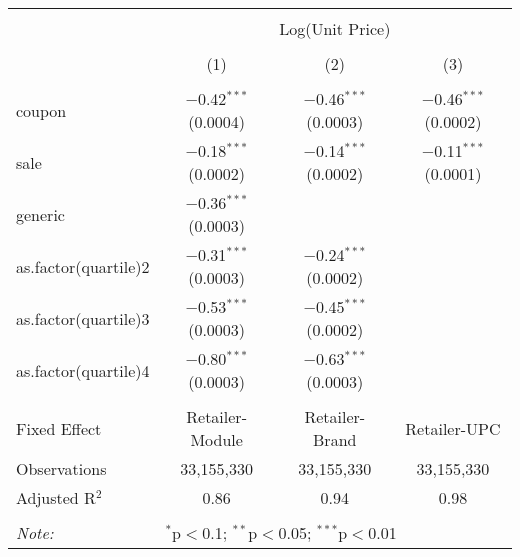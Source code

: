 
\begin{table}[!htbp] \centering 
  \caption{} 
  \label{tab:overallSavings} 
\begin{tabular}{@{\extracolsep{5pt}}lccc} 
\\[-1.8ex]\hline 
\hline \\[-1.8ex] 
 & \multicolumn{3}{c}{Log(Unit Price)} \\ 
\\[-1.8ex] & (1) & (2) & (3)\\ 
\hline \\[-1.8ex] 
 coupon & $-$0.42$^{***}$ (0.0004) & $-$0.46$^{***}$ (0.0003) & $-$0.46$^{***}$ (0.0002) \\ 
  sale & $-$0.18$^{***}$ (0.0002) & $-$0.14$^{***}$ (0.0002) & $-$0.11$^{***}$ (0.0001) \\ 
  generic & $-$0.36$^{***}$ (0.0003) &  &  \\ 
  as.factor(quartile)2 & $-$0.31$^{***}$ (0.0003) & $-$0.24$^{***}$ (0.0002) &  \\ 
  as.factor(quartile)3 & $-$0.53$^{***}$ (0.0003) & $-$0.45$^{***}$ (0.0002) &  \\ 
  as.factor(quartile)4 & $-$0.80$^{***}$ (0.0003) & $-$0.63$^{***}$ (0.0003) &  \\ 
 \hline \\[-1.8ex] 
Fixed Effect & Retailer-Module & Retailer-Brand & Retailer-UPC \\ 
Observations & 33,155,330 & 33,155,330 & 33,155,330 \\ 
Adjusted R$^{2}$ & 0.86 & 0.94 & 0.98 \\ 
\hline 
\hline \\[-1.8ex] 
\textit{Note:}  & \multicolumn{3}{l}{$^{*}$p$<$0.1; $^{**}$p$<$0.05; $^{***}$p$<$0.01} \\ 
\end{tabular} 
\end{table} 
